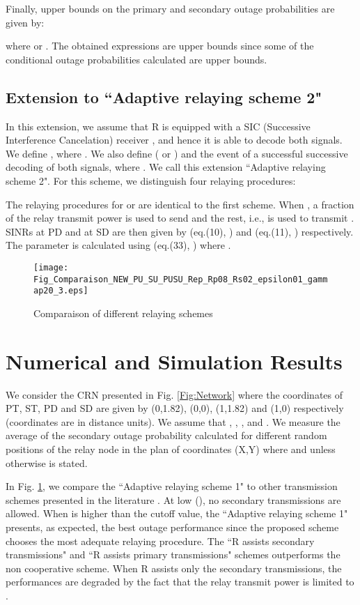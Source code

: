 \documentclass[conference,twocolumn]{IEEEtran}
\begin{document}
Finally, upper bounds on the primary and secondary outage probabilities are given by:

where  or . The obtained expressions are upper bounds since some of the conditional outage probabilities calculated are upper bounds.

\subsection{Extension to ``Adaptive relaying scheme 2"}
In this extension, we assume that R is equipped with a SIC (Successive Interference Cancelation) receiver \cite{Tse}, and hence it is able to decode both signals.
We define , where .
We also define  ( or ) and  the event of a successful successive decoding of both signals, where . We call this extension ``Adaptive relaying scheme 2". For this scheme, we distinguish four relaying procedures:


The relaying procedures for  or  are identical to the first scheme. When , a fraction of the relay transmit power  is used to send  and the rest, i.e.,  is used to transmit . SINRs at PD and at SD are then given by (eq.(10), \cite{Jaafar_Globecom}) and (eq.(11), \cite{Jaafar_Globecom}) respectively. The parameter  is calculated using (eq.(33), \cite{Jaafar_Globecom}) where .


\begin{figure}
\centering
  \texttt{[image: Fig\_Comparaison\_NEW\_PU\_SU\_PUSU\_Rep\_Rp08\_Rs02\_epsilon01\_gammap20\_3.eps]}
  \caption{Comparaison of different relaying schemes}
  \label{Fig:Compare_schemes}
\end{figure}

\section{Numerical and Simulation Results}
We consider the CRN presented in Fig. \ref{Fig:Network} where the coordinates of PT, ST, PD and SD are given by (0,1.82), (0,0), (1,1.82) and (1,0) respectively (coordinates are in distance units). We assume that , , ,  and . We measure the average of the secondary outage probability calculated for different random positions of the relay node in the plan of coordinates (X,Y) where  and  unless otherwise is stated.



In Fig. \ref{Fig:Compare_schemes}, we compare the ``Adaptive
relaying scheme 1" to other transmission schemes presented in the literature \cite{Zou,Jaafar_Globecom}. At low  (), no secondary transmissions are allowed. When  is higher than the cutoff value, the ``Adaptive relaying scheme 1" presents, as expected, the best outage performance since the proposed scheme chooses the most adequate relaying procedure. The ``R assists secondary transmissions" and ``R assists primary transmissions" schemes outperforms the non cooperative scheme. When R assists only the secondary transmissions, the performances are degraded by the fact that the relay transmit power is limited to .
\end{document}
